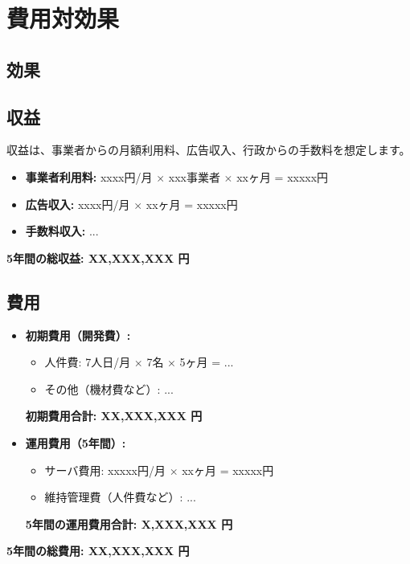 \documentclass{docs}
\begin{document}
\section{費用対効果}
\subsection{効果}


\subsection{収益}
収益は、事業者からの月額利用料、広告収入、行政からの手数料を想定します。
\begin{itemize}
    \item \textbf{事業者利用料:} xxxx円/月 $\times$ xxx事業者 $\times$ xxヶ月 = xxxxx円
    \item \textbf{広告収入:} xxxx円/月 $\times$ xxヶ月 = xxxxx円
    \item \textbf{手数料収入:} ...
\end{itemize}
\textbf{5年間の総収益: XX,XXX,XXX 円}

\subsection{費用}
\begin{itemize}
    \item \textbf{初期費用（開発費）:}
        \begin{itemize}
            \item 人件費: 7人日/月 $\times$ 7名 $\times$ 5ヶ月 = ...
            \item その他（機材費など）: ...
        \end{itemize}
        \textbf{初期費用合計: XX,XXX,XXX 円}
    \item \textbf{運用費用（5年間）:}
        \begin{itemize}
            \item サーバ費用: xxxxx円/月 $\times$ xxヶ月 = xxxxx円
            \item 維持管理費（人件費など）: ...
        \end{itemize}
        \textbf{5年間の運用費用合計: X,XXX,XXX 円}
\end{itemize}
\textbf{5年間の総費用: XX,XXX,XXX 円}
\end{document}
